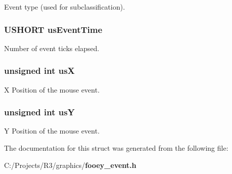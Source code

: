 Event type (used for subclassification). 
\subsubsection[{usEventTime}]{\setlength{\rightskip}{0pt plus 5cm}USHORT {\bf usEventTime}}\label{struct_f_o_o_e_y___e_v_e_n_t___s_t_r_u_c_t_af721361490a4fa7526a904e858503093}


Number of event ticks elapsed. 
\subsubsection[{usX}]{\setlength{\rightskip}{0pt plus 5cm}unsigned int {\bf usX}}\label{struct_f_o_o_e_y___e_v_e_n_t___s_t_r_u_c_t_aa93af2484aec41e715e6e0986030522b}


X Position of the mouse event. 
\subsubsection[{usY}]{\setlength{\rightskip}{0pt plus 5cm}unsigned int {\bf usY}}\label{struct_f_o_o_e_y___e_v_e_n_t___s_t_r_u_c_t_a265e5a3d439c15e761670259f1a5d36b}


Y Position of the mouse event. 

The documentation for this struct was generated from the following file:\begin{DoxyCompactItemize}
\item 
C:/Projects/R3/graphics/{\bf fooey\_\-event.h}\end{DoxyCompactItemize}
